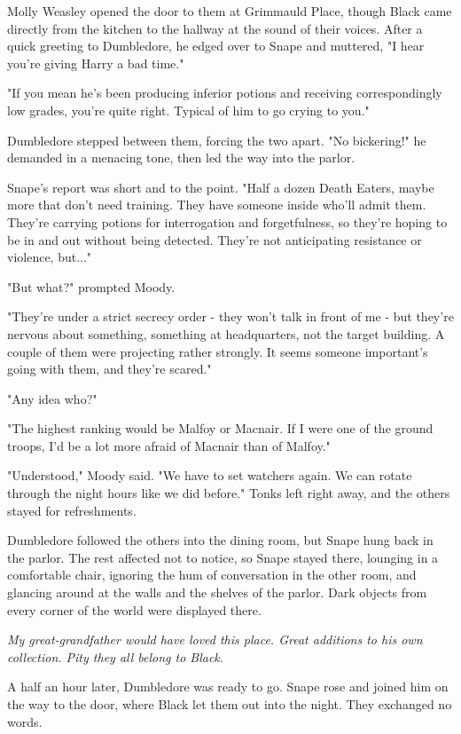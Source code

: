 \documentclass[a4paper,11pt]{article}
\begin{document}
Molly Weasley opened the door to them at Grimmauld Place, though Black came directly from the kitchen to the hallway at the sound of their voices. After a quick greeting to Dumbledore, he edged over to Snape and muttered, "I hear you're giving Harry a bad time."

"If you mean he's been producing inferior potions and receiving correspondingly low grades, you're quite right. Typical of him to go crying to you."

Dumbledore stepped between them, forcing the two apart. "No bickering!" he demanded in a menacing tone, then led the way into the parlor.

Snape's report was short and to the point. "Half a dozen Death Eaters, maybe more that don't need training. They have someone inside who'll admit them. They're carrying potions for interrogation and forgetfulness, so they're hoping to be in and out without being detected. They're not anticipating resistance or violence, but..."

"But what?" prompted Moody.

"They're under a strict secrecy order - they won't talk in front of me - but they're nervous about something, something at headquarters, not the target building. A couple of them were projecting rather strongly. It seems someone important's going with them, and they're scared."

"Any idea who?"

"The highest ranking would be Malfoy or Macnair. If I were one of the ground troops, I'd be a lot more afraid of Macnair than of Malfoy."

"Understood," Moody said. "We have to set watchers again. We can rotate through the night hours like we did before." Tonks left right away, and the others stayed for refreshments.

Dumbledore followed the others into the dining room, but Snape hung back in the parlor. The rest affected not to notice, so Snape stayed there, lounging in a comfortable chair, ignoring the hum of conversation in the other room, and glancing around at the walls and the shelves of the parlor. Dark objects from every corner of the world were displayed there.

\emph{My great-grandfather would have loved this place. Great additions to his own collection. Pity they all belong to Black.}

A half an hour later, Dumbledore was ready to go. Snape rose and joined him on the way to the door, where Black let them out into the night. They exchanged no words.
\end{document}
